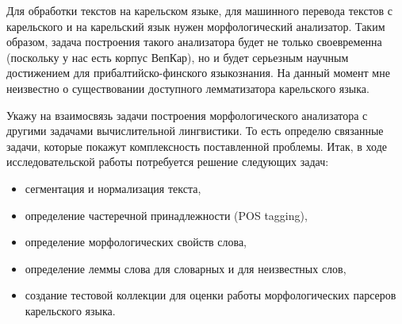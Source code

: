 Для обработки текстов на карельском языке, для машинного перевода текстов с карельского и на карельский язык нужен морфологический анализатор. Таким образом, задача построения такого анализатора будет не только своевременна (поскольку у нас есть корпус ВепКар), но и будет серьезным научным достижением для прибалтийско-финского языкознания. На данный момент мне неизвестно о существовании доступного лемматизатора карельского языка.

Укажу на взаимосвязь задачи построения морфологического анализатора с другими задачами вычислительной лингвистики. То есть определю связанные задачи, которые покажут комплексность поставленной проблемы. Итак, в ходе исследовательской работы потребуется решение следующих задач:
\begin{itemize}
\item сегментация и нормализация текста,
\item определение частеречной принадлежности (POS tagging),
\item определение морфологических свойств слова,
\item определение леммы слова для словарных и для неизвестных слов,
\item создание тестовой коллекции для оценки работы морфологических парсеров карельского языка.
\end{itemize}
